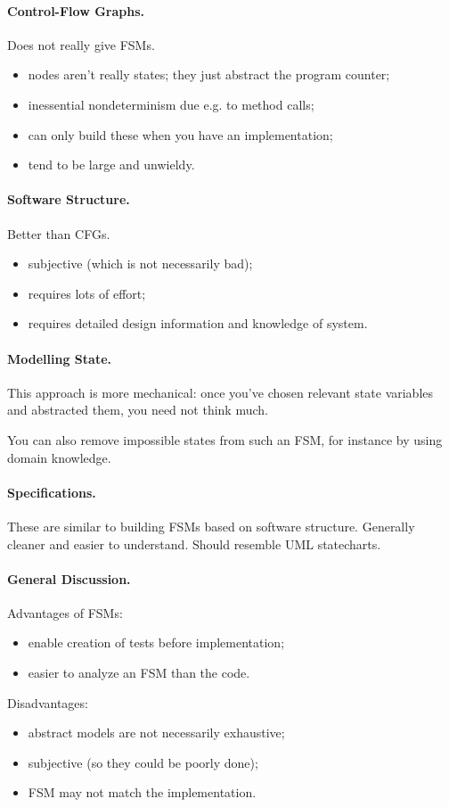 \documentclass[11pt]{article}
\begin{document}
\paragraph{Control-Flow Graphs.} Does not really give FSMs.
\begin{itemize}
\item nodes aren't really states; they just abstract the program
counter;
\item inessential nondeterminism due e.g. to method calls;
\item can only build these when you have an implementation;
\item tend to be large and unwieldy.
\end{itemize}

\paragraph{Software Structure.} Better than CFGs.
\begin{itemize}
\item subjective (which is not necessarily bad);
\item requires lots of effort;
\item requires detailed design information and knowledge of system.
\end{itemize}

\paragraph{Modelling State.} 
This approach is more mechanical: once you've chosen relevant state
variables and abstracted them, you need not think much.

You can also remove impossible states from such an FSM, for instance
by using domain knowledge.

\paragraph{Specifications.}
These are similar to building FSMs based on software structure.
Generally cleaner and easier to understand. Should resemble UML
statecharts.

\paragraph{General Discussion.} Advantages of FSMs:
\begin{itemize}
\item enable creation of tests before implementation;
\item easier to analyze an FSM than the code.
\end{itemize}
Disadvantages:
\begin{itemize}
\item abstract models are not necessarily exhaustive;
\item subjective (so they could be poorly done);
\item FSM may not match the implementation.
\end{itemize}
\end{document}
